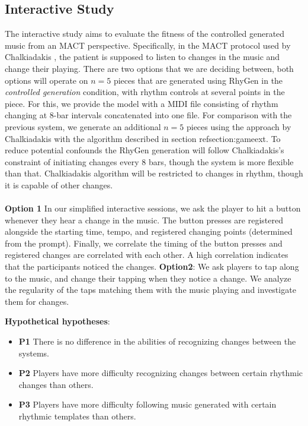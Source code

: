 \subsection{Interactive Study}
The interactive study aims to evaluate the fitness of the controlled generated music from an MACT perspective. Specifically, in the MACT protocol used by Chalkiadakis \cite{Chalkiadakis_2022}, the patient is supposed to listen to changes in the music and change their playing. There are two options that we are deciding between, both options will operate on $n=5$ pieces that are generated using RhyGen in the \textit{controlled generation} condition, with rhythm controls at several points in the piece. For this, we provide the model with a MIDI file consisting of rhythm changing at 8-bar intervals concatenated into one file.
For comparison with the previous system, we generate an additional $n=5$ pieces using the approach by Chalkiadakis \cite{Chalkiadakis_2022} with the algorithm described in section ref{section:gameext}. To reduce potential confounds the RhyGen generation will follow Chalkiadakis's constraint of initiating changes every 8 bars, though the system is more flexible than that. Chalkiadakis algorithm will be restricted to changes in rhythm, though it is capable of other changes.\\\\
\textbf{Option 1}
In our simplified interactive sessions, we ask the player to hit a button whenever they hear a change in the music. The button presses are registered alongside the starting time, tempo, and registered changing points (determined from the prompt). Finally, we correlate the timing of the button presses and registered changes are correlated with each other. A high correlation indicates that the participants noticed the changes. 
\textbf{Option2}: We ask players to tap along to the music, and change their tapping when they notice a change. We analyze the regularity of the taps matching them with the music playing and investigate them for changes. 

\textbf{Hypothetical hypotheses}: 
\begin{itemize}
\item \textbf{P1} There is no difference in the abilities of recognizing changes between the systems.
\item \textbf{P2} Players have more difficulty recognizing changes between certain rhythmic changes than others.
\item \textbf{P3} Players have more difficulty following music generated with certain rhythmic templates than others.     
\end{itemize}

